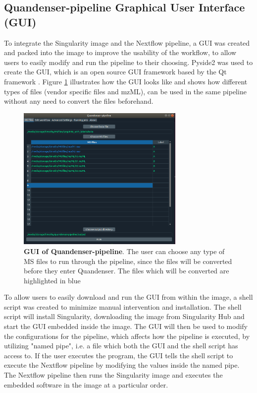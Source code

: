 \subsection{Quandenser-pipeline Graphical User Interface (GUI)}
To integrate the Singularity image and the Nextflow pipeline, a GUI was created and packed into the image to improve the usability of the workflow, to allow users to easily modify and run the pipeline to their choosing. Pyside2 was used to create the GUI, which is an open source GUI framework based by the Qt framework \cite{pyside2}. Figure \ref{fig:GUI} illustrates how the GUI looks like and shows how different types of files (vendor specific files and mzML), can be used in the same pipeline without any need to convert the files beforehand.

\begin{figure}[H]
  \begin{center}
  \includegraphics[height=7cm]{pictures/gui.png}
  \caption{\textbf{GUI of Quandenser-pipeline}. The user can choose any type of MS files to run through the pipeline, since the files will be converted before they enter Quandenser. The files which will be converted are highlighted in blue}
  \label{fig:GUI}
  \end{center}
\end{figure}

To allow users to easily download and run the GUI from within the image, a shell script was created to minimize manual intervention and installation. The shell script will install Singularity, downloading the image from Singularity Hub and start the GUI embedded inside the image. The GUI will then be used to modify the configurations for the pipeline, which affects how the pipeline is executed, by utilizing "named pipe", i.e. a file which both the GUI and the shell script has access to. If the user executes the program, the GUI tells the shell script to execute the Nextflow pipeline by modifying the values inside the named pipe. The Nextflow pipeline then runs the Singularity image and executes the embedded software in the image at a particular order.

